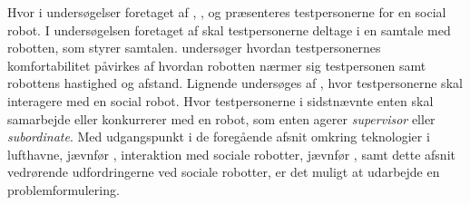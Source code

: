 Hvor i undersøgelser foretaget af \textcite[s. 1480]{PDF:ExploringInfluencingVariable}, \textcite[ss. 190-191]{PDF:PsychologicalEffects}, \textcite[s. 173]{PDF:HowMayIServeYou} og \textcite[ss. 786-787]{PDF:HowSocialDistanceShapesHRI} præsenteres testpersonerne for en social robot. I undersøgelsen foretaget af \textcite[s. 1480]{PDF:ExploringInfluencingVariable} skal testpersonerne deltage i en samtale med robotten, som styrer samtalen. \textcite[ss. 190-191]{PDF:PsychologicalEffects} undersøger hvordan testpersonernes komfortabilitet påvirkes af hvordan robotten nærmer sig testpersonen samt robottens hastighed og afstand. Lignende undersøges af \textcite[s. 173]{PDF:HowMayIServeYou}, hvor testpersonerne skal interagere med en social robot. Hvor testpersonerne i sidstnævnte enten skal samarbejde eller konkurrerer med en robot, som enten agerer \textit{supervisor} eller \textit{subordinate}.\blankline
%
Med udgangspunkt i de foregående afsnit omkring teknologier i lufthavne, jævnfør , interaktion med sociale robotter, jævnfør , samt dette afsnit vedrørende udfordringerne ved sociale robotter, er det muligt at udarbejde en problemformulering. 
  
